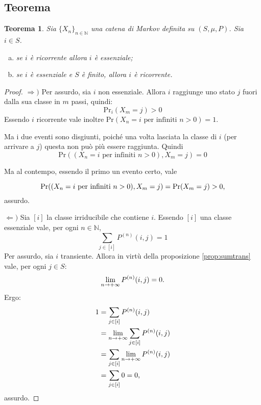 \documentclass{article}
\theoremstyle{plain}
\newtheorem{thm}{Teorema}
\newcommand{\N}{\mathbb N}
\newcommand{\chain}[1]{\{#1_n\}_{n\in\N}}
\newcommand{\ape}[1]{^{(#1)}}
\renewcommand{\Pr}{\mathrm{Pr}}
\begin{document}
\subsection{Teorema}
\begin{thm}
	Sia $\chain X$ una catena di Markov definita su $(S,\mu,P)$. Sia $i\in S$.
	\begin{enumerate}[(a)]
		\item \label{elem:ricess1} se $i$ è ricorrente allora $i$ è essenziale;
		\item \label{elem:ricess2} se $i$ è essenziale e $S$ è finito, allora $i$ è ricorrente.
	\end{enumerate}
\end{thm}
\begin{proof}
	$\Rightarrow)$
	Per assurdo, sia $i$ non essenziale. Allora $i$ raggiunge uno stato $j$ fuori dalla sua classe in $m$ passi, quindi:
	\begin{equation*}
		\Pr_i(X_m=j)>0
	\end{equation*}
	Essendo $i$ ricorrente vale inoltre $\Pr(X_n=i \text{ per infiniti $n>0$})=1$.

	Ma i due eventi sono disgiunti, poiché una volta lasciata la classe di $i$ (per arrivare a $j$) questa non può più essere raggiunta. Quindi
	\begin{equation*}
		\Pr((X_n=i \text{ per infiniti $n>0$}),X_m=j) = 0
	\end{equation*}

	Ma al contempo, essendo il primo un evento certo, vale

	\begin{equation*}
		\Pr((X_n=i \text{ per infiniti $n>0$}),X_m=j) = \Pr(X_m=j)>0 \text,
	\end{equation*}
	assurdo.

	$\Leftarrow)$
	Sia $[i]$ la classe irriducibile che contiene $i$. Essendo $[i]$ una classe essenziale vale, per ogni $n\in\N$,
	\begin{equation*}
		\sum_{j\in[i]} P\ape{n}(i,j) = 1
	\end{equation*}
	Per assurdo, sia $i$ transiente. Allora in virtù della proposizione \ref{prop:sumtrans} vale, per ogni $j\in S$:
	\begin{equation*}
		\lim_{n\to+\infty} P\ape{n}(i,j) = 0 \text.
	\end{equation*}
	Ergo:
	\begin{align*}
		1 & = \sum_{j\in[i]} P\ape{n}(i,j)                    \\
		  & = \lim_{n\to+\infty} \sum_{j\in[i]} P\ape{n}(i,j) \\
		  & = \sum_{j\in[i]} \lim_{n\to+\infty} P\ape{n}(i,j) \\
		  & = \sum_{j\in[i]} 0 = 0 \text,
	\end{align*}
	assurdo. \qedhere
\end{proof}
\end{document}
